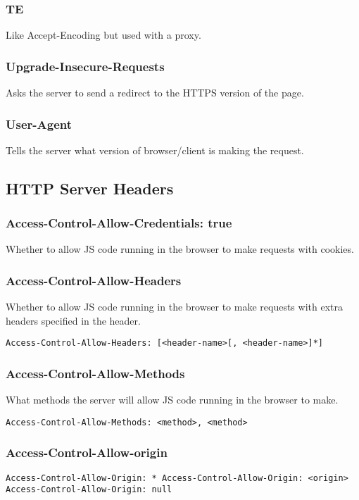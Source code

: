 \documentclass[../CMPUT-404-Notes.tex]{subfiles}
\begin{document}
\subsubsection{TE}
Like Accept-Encoding but used with a proxy.

\subsubsection{Upgrade-Insecure-Requests} 
Asks the server to send a redirect to the HTTPS version of the page.

\subsubsection{User-Agent}
Tells the server what version of browser/client is making the request.

\subsection{HTTP Server Headers}

\subsubsection{Access-Control-Allow-Credentials: true}
Whether to allow JS code running in the browser to make requests with cookies.

\subsubsection{Access-Control-Allow-Headers} 
Whether to allow JS code running in the browser to make requests with extra headers specified in the header.

\texttt{Access-Control-Allow-Headers: [<header-name>[, <header-name>]*]}

\subsubsection{Access-Control-Allow-Methods}  
What methods the server will allow JS code running in the browser to make.

\texttt{Access-Control-Allow-Methods: <method>, <method>}

\subsubsection{Access-Control-Allow-origin}
\texttt{Access-Control-Allow-Origin: *
Access-Control-Allow-Origin: <origin>
Access-Control-Allow-Origin: null}
\end{document}
